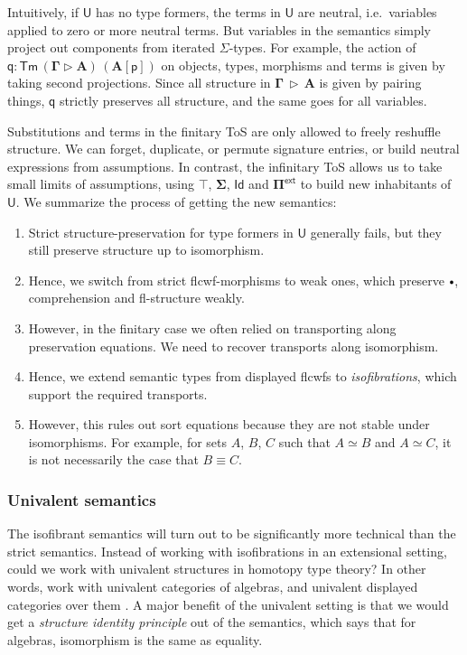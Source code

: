 \documentclass[12pt,a4paper,twoside,openany]{book}
\theoremstyle{remark}
\theoremstyle{definition}
\theoremstyle{theorem}
\newcommand{\bs}[1]{\boldsymbol{#1}}
\newcommand{\Tm}{\mathsf{Tm}}
\newcommand{\U}{\mathsf{U}}
\newcommand{\Id}{\mathsf{Id}}
\newcommand{\ext}{\triangleright}
\newcommand{\emptycon}{\scaleobj{.75}\bullet}
\newcommand{\Piinf}{\Pi^{\mathsf{ext}}}
\newcommand{\p}{\mathsf{p}}
\newcommand{\q}{\mathsf{q}}
\newcommand{\bU}{\bs{\U}}
\begin{document}
Intuitively, if $\bU$ has no type formers, the terms in $\bU$ are neutral,
i.e.\ variables applied to zero or more neutral terms. But variables in the
semantics simply project out components from iterated $\Sigma$-types. For
example, the action of $\bs{\q} : \bs{\Tm\,(\Gamma \ext A)\,(A[\p])}$ on
objects, types, morphisms and terms is given by taking second
projections. Since all structure in $\bs{\Gamma\,\ext\,A}$ is given by pairing
things, $\bs{\q}$ strictly preserves all structure, and the same goes
for all variables.

Substitutions and terms in the finitary ToS are only allowed to freely reshuffle
structure. We can forget, duplicate, or permute signature entries, or build
neutral expressions from assumptions. In contrast, the infinitary ToS allows us
to take small limits of assumptions, using $\bs{\top}$, $\bs{\Sigma}$, $\bs{\Id}$ and $\bs{\Piinf}$
to build new inhabitants of $\bU$. We summarize the process of getting the new
semantics:
\begin{enumerate}
\item Strict structure-preservation for type formers in $\bU$ generally fails, but they still
      preserve structure up to isomorphism.
\item Hence, we switch from strict flcwf-morphisms to weak ones, which preserve $\emptycon$, comprehension
      and fl-structure weakly.
\item However, in the finitary case we often relied on transporting along
      preservation equations. We need to recover transports along isomorphism.
\item Hence, we extend semantic types from displayed flcwfs to \emph{isofibrations}, which
      support the required transports.
\item However, this rules out sort equations because they are not stable under
      isomorphisms. For example, for sets $A$, $B$, $C$ such that $A \simeq B$ and
      $A \simeq C$, it is not necessarily the case that $B \equiv C$.
\end{enumerate}

\subsubsection{Univalent semantics}

The isofibrant semantics will turn out to be significantly more technical than
the strict semantics. Instead of working with isofibrations in an extensional
setting, could we work with univalent structures in homotopy type theory? In
other words, work with univalent categories of algebras, and univalent displayed
categories over them \cite{displayedcats}. A major benefit of the univalent
setting is that we would get a \emph{structure identity principle}
\cite{aczel2011voevodsky} out of the semantics, which says that for algebras,
isomorphism is the same as equality.
\end{document}
